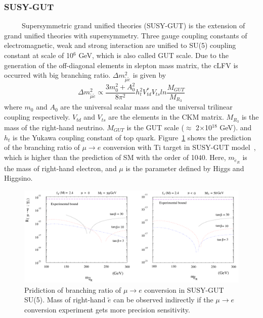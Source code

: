 \subsubsection{SUSY-GUT}
~~~~~Supersymmetric grand unified theories (SUSY-GUT) is the extension of grand unified theories with supersymmetry.
Three gauge coupling constants of electromagnetic, weak and strong interaction are unified to SU(5) coupling constant at scale of 10$^6$ GeV, which is also called GUT scale.
Due to the generation of the off-diagonal elements in slepton mass matrix, the cLFV is occurred with big branching ratio.
$\Delta m_{\tilde{\mu}\tilde{e}}^2$ is given by
\begin{equation}
 \Delta m_{\tilde{\mu}\tilde{e}}^2 \propto \frac{3m_0^2 + A_0^2}{8\pi^2}h_t^2V_{td}^*V_{ts}ln\frac{M_{GUT}}{M_{R_3}}
\end{equation}
where $m_0$ and $A_0$ are the universal scalar mass and the universal trilinear coupling respectively.
$V_{td}$ and $V_{ts}$ are the elements in the CKM matrix.
$M_{R_3}$ is the mass of the right-hand neutrino.
$M_{GUT}$ is the GUT scale ($\approx$ 2$\times$10$^{18}$ GeV).
and $h_t$ is the Yukawa coupling constant of top quark.
Figure~\ref{susygut} shows the prediction of the branching ratio of $\mu \rightarrow e$ conversion with Ti target in SUSY-GUT model~\cite{kuno}, which is higher than the prediction of SM with the order of 10$40$.
Here, $m_{\tilde{e}_R}$ is the mass of right-hand electron, and $\mu$ is the parameter defined by Higgs and Higgsino.
\begin{figure}[H]
 \centering
 \includegraphics[scale=0.68]{chapter1/fig/gut.pdf}
 \caption{Pridiction of branching ratio of $\mu \rightarrow e$ conversion in SUSY-GUT SU(5). Mass of right-hand $\tilde{e}$ can be observed indirectly if the $\mu \rightarrow e$ conversion experiment gets more precision sensitivity.}
 \label{susygut}
\end{figure}

